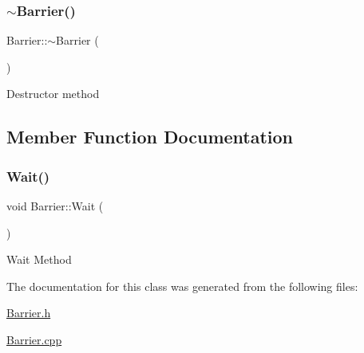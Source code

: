 \subsubsection{\texorpdfstring{$\sim$\+Barrier()}{~Barrier()}}
{\footnotesize\ttfamily Barrier\+::$\sim$\+Barrier (\begin{DoxyParamCaption}{ }\end{DoxyParamCaption})}

Destructor method 

\subsection{Member Function Documentation}
\mbox{\label{class_barrier_a7de2afc6097b37c051d864bdf694c7e0}} 
\subsubsection{\texorpdfstring{Wait()}{Wait()}}
{\footnotesize\ttfamily void Barrier\+::\+Wait (\begin{DoxyParamCaption}{ }\end{DoxyParamCaption})}

Wait Method 

The documentation for this class was generated from the following files\+:\begin{DoxyCompactItemize}
\item 
\hyperlink{_barrier_8h}{Barrier.\+h}\item 
\hyperlink{_barrier_8cpp}{Barrier.\+cpp}\end{DoxyCompactItemize}
